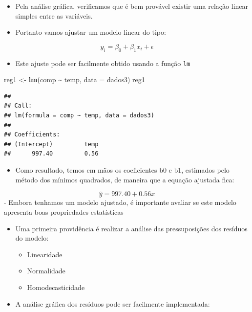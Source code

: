 \documentclass[
]{book}
\newenvironment{Shaded}{\begin{snugshade}}{\end{snugshade}}
\newcommand{\AttributeTok}[1]{\textcolor[rgb]{0.13,0.29,0.53}{#1}}
\newcommand{\FunctionTok}[1]{\textcolor[rgb]{0.13,0.29,0.53}{\textbf{#1}}}
\newcommand{\NormalTok}[1]{#1}
\newcommand{\OtherTok}[1]{\textcolor[rgb]{0.56,0.35,0.01}{#1}}
\newcommand{\SpecialCharTok}[1]{\textcolor[rgb]{0.81,0.36,0.00}{\textbf{#1}}}
\providecommand{\tightlist}{%
  \setlength{\itemsep}{0pt}\setlength{\parskip}{0pt}}
\begin{document}
\begin{itemize}
\tightlist
\item
  Pela análise gráfica, verificamos que é bem provável existir uma relação linear simples entre as variáveis.
\item
  Portanto vamos ajustar um modelo linear do tipo:
\end{itemize}

\[y_{i}=\beta _{0}+\beta _{1}x_{i}+\epsilon\]

\begin{itemize}
\tightlist
\item
  Este ajuste pode ser facilmente obtido usando a função \texttt{lm}
\end{itemize}

\begin{Shaded}
\begin{Highlighting}[]
\NormalTok{reg1 }\OtherTok{\textless{}{-}} \FunctionTok{lm}\NormalTok{(comp }\SpecialCharTok{\textasciitilde{}}\NormalTok{ temp, }\AttributeTok{data =}\NormalTok{ dados3)}
\NormalTok{reg1}
\end{Highlighting}
\end{Shaded}

\begin{verbatim}
## 
## Call:
## lm(formula = comp ~ temp, data = dados3)
## 
## Coefficients:
## (Intercept)         temp  
##      997.40         0.56
\end{verbatim}

\begin{itemize}
\tightlist
\item
  Como resultado, temos em mãos os coeficientes b0 e b1, estimados pelo método dos mínimos quadrados, de maneira que a equação ajustada fica:
\end{itemize}

\[\hat{y}=997.40 +0.56x\]
- Embora tenhamos um modelo ajustado, é importante avaliar se este modelo apresenta boas propriedades estatísticas

\begin{itemize}
\tightlist
\item
  Uma primeira providência é realizar a análise das pressuposições dos resíduos do modelo:

  \begin{itemize}
  \tightlist
  \item
    Linearidade
  \item
    Normalidade
  \item
    Homodecasticidade
  \end{itemize}
\item
  A análise gráfica dos resíduos pode ser facilmente implementada:
\end{itemize}
\end{document}
